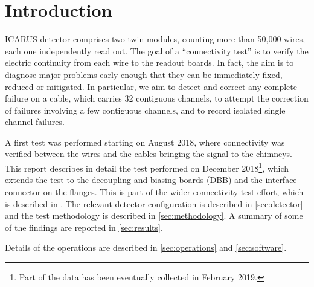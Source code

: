 \section{Introduction}
\label{sec:introduction}

ICARUS detector comprises two twin modules, counting more than 50,000
wires\cite{ICARUSTPC}, each one independently read out.
The goal of a ``connectivity test'' is to verify the electric continuity from
each wire to the readout boards. In fact, the aim is to diagnose major problems
early enough that they can be immediately fixed, reduced or mitigated.
In particular, we aim to detect and correct any complete failure on a cable,
which carries 32 contiguous channels, to attempt the correction of failures
involving a few contiguous channels, and to record isolated single channel
failures.

A first test was performed starting on August 2018\cite{ConnTest201808}, where
connectivity was verified between the wires and the cables bringing the signal
to the chimneys. This report describes in detail the test performed on December
2018\footnote{
Part of the data has been eventually collected in February 2019.
}, which extends the test to the decoupling and biasing boards (DBB) and the
interface connector on the flanges. This is part of the wider connectivity test
effort, which is described in \cite{ConnTest201808}.
The relevant detector configuration is described in \cref{sec:detector} and the
test methodology is described in \cref{sec:methodology}.
A summary of some of the findings are reported in \cref{sec:results}.

Details of the operations are described in \cref{sec:operations} and
\cref{sec:software}.
